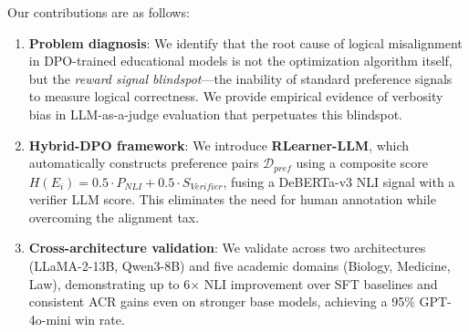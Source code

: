 Our contributions are as follows:
\begin{enumerate}
    \item \textbf{Problem diagnosis}: We identify that the root cause of logical misalignment in DPO-trained educational models is not the optimization algorithm itself, but the \textit{reward signal blindspot}---the inability of standard preference signals to measure logical correctness. We provide empirical evidence of verbosity bias in LLM-as-a-judge evaluation that perpetuates this blindspot.
    \item \textbf{Hybrid-DPO framework}: We introduce \textbf{RLearner-LLM}, which automatically constructs preference pairs $\mathcal{D}_{pref}$ using a composite score $H(E_i) = 0.5 \cdot P_{NLI} + 0.5 \cdot S_{Verifier}$, fusing a DeBERTa-v3 NLI signal with a verifier LLM score. This eliminates the need for human annotation while overcoming the alignment tax.
    \item \textbf{Cross-architecture validation}: We validate across two architectures (LLaMA-2-13B, Qwen3-8B) and five academic domains (Biology, Medicine, Law), demonstrating up to 6$\times$ NLI improvement over SFT baselines and consistent ACR gains even on stronger base models, achieving a 95\% GPT-4o-mini win rate.
\end{enumerate}
